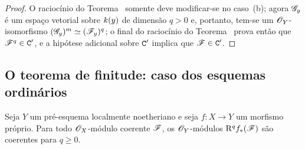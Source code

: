 \begin{proof}
O raciocínio do Teorema~ somente deve modificar-se no caso~(b); agora $\mathscr{G}_y$ é um espaço vetorial sobre $k(y)$ de dimensão $q>0$ e, portanto, tem-se um $\mathscr{O}_Y$-isomorfismo $(\mathscr{G}_y)^m\simeq(\mathscr{F}_y)^q$; o final do raciocínio do Teorema~ prova então que $\mathscr{F}^q\in\mathtt{C}'$, e a hipótese adicional sobre $\mathtt{C}'$ implica que $\mathscr{F}\in\mathtt{C}'$.
\end{proof}

\subsection{O teorema de finitude: caso dos esquemas ordinários}
\label{subsection:III.3.2}
\label{III.3.2}

\begin{theorem}[3.2.1]
\label{III.3.2.1}
Seja $Y$ um pré-esquema localmente noetheriano e seja $f:X\to Y$ um morfismo próprio.
Para todo $\mathscr{O}_X$-módulo coerente $\mathscr{F}$, os $\mathscr{O}_Y$-módulos $\mathrm{R}^q f_*(\mathscr{F})$ são coerentes para $q\geq 0$.
\end{theorem}

